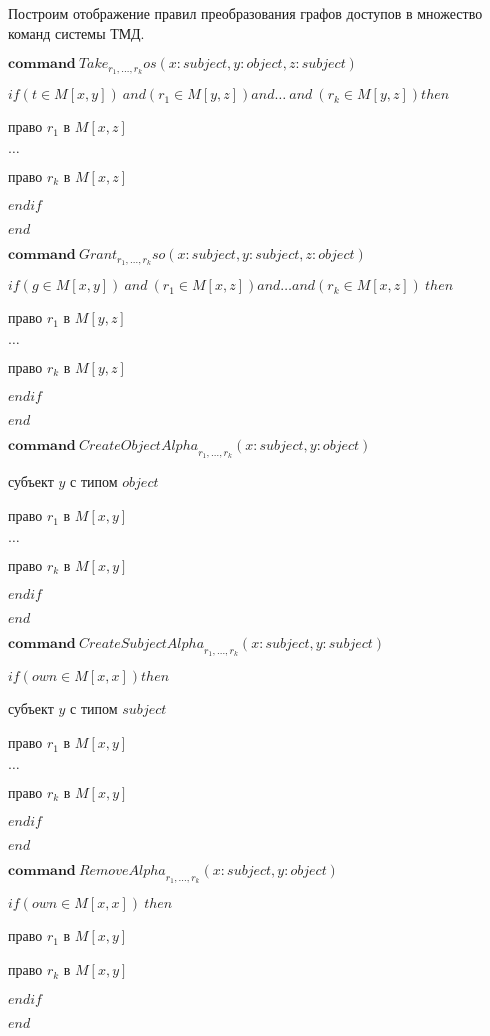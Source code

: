 	Построим отображение правил преобразования графов доступов в множество команд системы ТМД.
\begin{multicols}{2}
	\begin{itemize*}
		\item 	$\mathbf{command} \ \mathit{Take}_{r_1, \ldots, r_k}os(x: subject,y:object,z:subject)$

			$if (t \in M[x,y]) \ and (r_1 \in M[y,z])and  \ldots \ and \ (r_k \in M[y,z]) then $

			 право $r_1$ в $M[x,z]$

			$\ldots$

			 право $r_k$ в $M[x,z]$

			$endif$

			$end$

			\item $\mathbf{command} \  \mathit{Grant}_{r_1, \ldots, r_k}so(x: subject,y:subject,z:object)$

			$if (g \in M[x,y]) \ and  \ (r_1 \in M[x,z]) and  \ldots and (r_k \in M[x,z]) \ then $

			 право $r_1$ в $M[y,z]$

			$\ldots$

			 право $r_k$ в $M[y,z]$

			$endif$

			$end$
	\end{itemize*}

	\begin{itemize*}
		\item 		$\mathbf{command} \  \mathit{CreateObjectAlpha}_{r_1, \ldots, r_k}(x: subject,y:object)$


				 субъект $y$ с типом $object$

				 право $r_1$ в $M[x,y]$

				$\ldots$

				 право $r_k$ в $M[x,y]$

				$endif$

				$end$
				\item		$\mathbf{command} \ \mathit{CreateSubjectAlpha}_{r_1, \ldots, r_k}(x: subject,y:subject)$

						$if (own \in M[x,x]) then $

						 субъект $y$ с типом $subject$

						 право $r_1$ в $M[x,y]$

						$\ldots$

						 право $r_k$ в $M[x,y]$

						$endif$

						$end$
	\end{itemize*}
\end{multicols}


		$\mathbf{command} \ \mathit{RemoveAlpha}_{r_1, \ldots, r_k}(x: subject,y:object)$

		$if (own \in M[x,x]) \ then $

		 право $r_1$ в $M[x,y]$

		 право $r_k$ в $M[x,y]$

		$endif$

		$end$
\newpage
